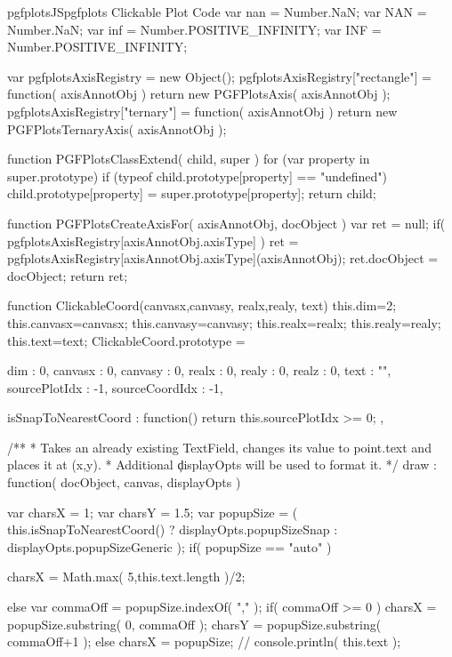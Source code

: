\begin{insDLJS}[processAnnotatedPlot]{pgfplotsJS}{pgfplots Clickable Plot Code}
var nan = Number.NaN;
var NAN = Number.NaN;
var inf = Number.POSITIVE_INFINITY;
var INF = Number.POSITIVE_INFINITY;

var pgfplotsAxisRegistry = new Object();
pgfplotsAxisRegistry["rectangle"]	= function( axisAnnotObj ) { return new PGFPlotsAxis( axisAnnotObj ); }
pgfplotsAxisRegistry["ternary"]		= function( axisAnnotObj ) { return new PGFPlotsTernaryAxis( axisAnnotObj ); }

function PGFPlotsClassExtend( child, super )
{
	for (var property in super.prototype) {
		if (typeof child.prototype[property] == "undefined")
			child.prototype[property] = super.prototype[property];
	}
	return child;
}

function PGFPlotsCreateAxisFor( axisAnnotObj, docObject )
{
	var ret = null;
	if( pgfplotsAxisRegistry[axisAnnotObj.axisType] ) {
		ret = pgfplotsAxisRegistry[axisAnnotObj.axisType](axisAnnotObj);
		ret.docObject = docObject;
	}
	return ret;
}

function ClickableCoord(canvasx,canvasy, realx,realy, text)
{
	this.dim=2;
	this.canvasx=canvasx;
	this.canvasy=canvasy;
	this.realx=realx;
	this.realy=realy;
	this.text=text;
}
ClickableCoord.prototype = 
{
	dim : 0,
	canvasx : 0,
	canvasy : 0,
	realx : 0,
	realy : 0,
	realz : 0,
	text : "",
	sourcePlotIdx : -1,
	sourceCoordIdx : -1,

	isSnapToNearestCoord : function() {
		return this.sourcePlotIdx >= 0;
	},

	/**
	 * Takes an already existing TextField, changes its value to point.text and places it at (x,y).
	 * Additional \c displayOpts will be used to format it.
	 */
	draw : function( docObject, canvas, displayOpts )
	{
		var charsX = 1;
		var charsY = 1.5;
		var popupSize = ( this.isSnapToNearestCoord() ? displayOpts.popupSizeSnap : displayOpts.popupSizeGeneric );
		if( popupSize == "auto" ) {
			charsX = Math.max( 5,this.text.length )/2;

		} else {
			var commaOff = popupSize.indexOf( "," );
			if( commaOff >= 0 ) {
				charsX = popupSize.substring( 0, commaOff );
				charsY = popupSize.substring( commaOff+1 );
			} else
				charsX = popupSize;
		}
	//	console.println( this.text );

}}
\end{insDLJS}
